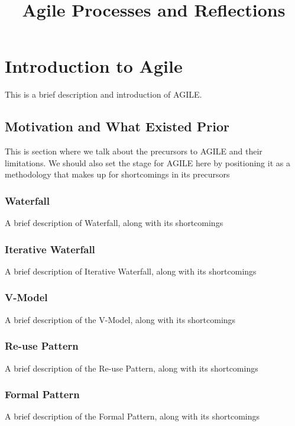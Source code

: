 \documentclass[11pt]{article}
\title{Agile Processes and Reflections}
\author{}
\begin{document}
\maketitle
\tableofcontents %
\listoffigures %

\section{Introduction to Agile}
This is a brief description and introduction of AGILE.

\subsection{Motivation and What Existed Prior}
This is section where we talk about the precursors to AGILE and their limitations.
We should also set the stage for AGILE here by positioning it as a methodology that makes up for shortcomings in
its precursors

\subsubsection{Waterfall}
A brief description of Waterfall, along with its shortcomings

\subsubsection{Iterative Waterfall}
A brief description of Iterative Waterfall, along with its shortcomings

\subsubsection{V-Model}
A brief description of the V-Model, along with its shortcomings

\subsubsection{Re-use Pattern}
A brief description of the Re-use Pattern, along with its shortcomings

\subsubsection{Formal Pattern}
A brief description of the Formal Pattern, along with its shortcomings
\end{document}
